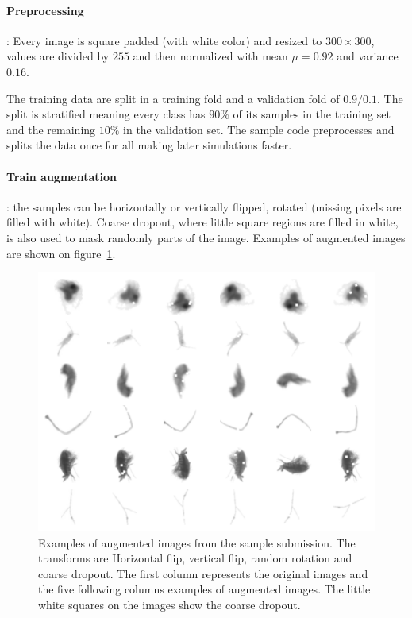 \documentclass{article}
\begin{document}
\paragraph{Preprocessing}: Every image is square padded (with white color) and resized to $300 \times 300$, values are divided by $255$ and then normalized with mean $\mu=0.92$ and variance $0.16$.

The training data are split in a training fold and a validation fold of $0.9/0.1$. The split is stratified meaning every class has $90\%$ of its samples in the training set and the remaining $10\%$ in the validation set. The sample code preprocesses and splits the data once for all making later simulations faster.

\paragraph{Train augmentation}: the samples can be horizontally or vertically flipped, rotated (missing pixels are filled with white). Coarse dropout, where little square regions are filled in white, is also used to mask randomly parts of the image. Examples of augmented images are shown on figure~\ref{fig:sample_submission_augmented}.

\begin{figure}[htbp]
	\begin{center}
	\includegraphics[width=0.75\columnwidth]{figs/augmented_images.pdf}
	\caption{\label{fig:sample_submission_augmented} Examples of augmented images from the sample submission. The transforms are Horizontal flip, vertical flip, random rotation and coarse dropout. The first column represents the original images and the five following columns examples of augmented images. The little white squares on the images show the coarse dropout.}
	\end{center}
\end{figure}
\end{document}
